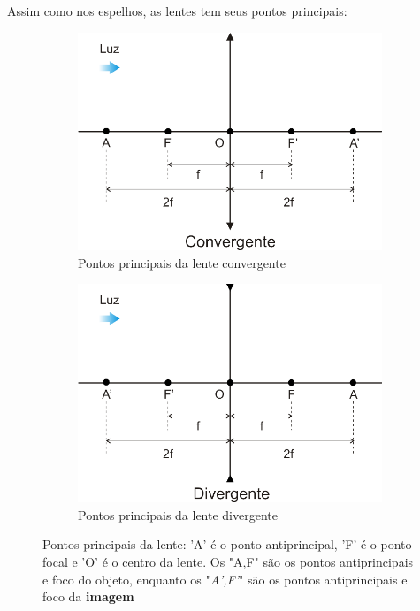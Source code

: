 \documentclass[12pt]{extarticle}
\newcommand{\<}{\langle}
\renewcommand{\>}{\rangle}
\theoremstyle{definition}
\begin{document}
Assim como nos espelhos, as lentes tem seus pontos principais:
\begin{figure}[H]
    \centering
    \begin{subfigure}[b]{0.45\textwidth}
         \centering
         \includegraphics[width=\textwidth]{conv11.png}
         \caption{Pontos principais da lente convergente}
         \label{fig:pontos_conv}
     \end{subfigure}
     \hfill
     \begin{subfigure}[b]{0.45\textwidth}
         \centering
         \includegraphics[width=\textwidth]{div11.png}
         \caption{Pontos principais da lente divergente}
         \label{fig:pontos_div}
     \end{subfigure}
    \caption{Pontos principais da lente: 'A' é o ponto antiprincipal, 'F' é o ponto focal e 'O' é o centro da lente. Os "A,F" são os pontos antiprincipais e foco do objeto, enquanto os "\textit{A',F'}" são os pontos antiprincipais e foco da \textbf{imagem}}
    \label{fig:pontos principais}
\end{figure}
\end{document}
